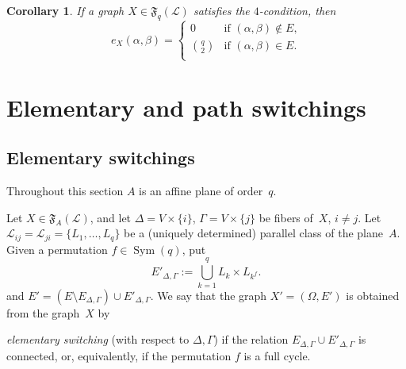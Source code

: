 \documentclass{amsart}
\newcommand{\cal}{\mathcal}
\newtheorem{corollary}[formula]{Corollary}
\def\crllrl#1{\begin{corollary}\label{#1}}
\def\ecrllr{\end{corollary}}
\def\css{\begin{cases}}
\def\ecss{\end{cases}}
\def\prf{\begin{proof}}
\def\eprf{\end{proof}}
\def\cL{{\cal L}}
\def\fF{{\mathfrak F}}
\DeclareMathOperator{\sym}{Sym}
\begin{document}
\crllrl{060623a14}
If a graph   $X\in\fF_q(\cL)$ satisfies the $4$-condition, then 
$$
e_X(\alpha,\beta)=
\css
0 &\text{if $(\alpha,\beta)\not \in E$,}\\
\binom{q}{2} &\text{if $(\alpha,\beta)\in E$.}\\
\ecss
$$
\ecrllr
\begin{comment}
\prf
Let $\alpha$ and $\beta$ be non-adjacent in $X$. By Lemma~\ref{110723a}, we have $b(\alpha,\beta)=0$. It follows that the graph $X_{N(\alpha,\beta)}$ is empty, where $N(\alpha,\beta)=N_X(\alpha,\beta)$. Thus, $e_X(\alpha,\beta)=0$. Now let $\alpha$ and $\beta$ be adjacent in $X$. Then any two vertices in the set $N(\alpha,\beta)$ must be adjacent (for otherwise $e_X(\alpha',\beta')\ne 0$ for some nonadjacent vertices $\alpha',\beta'\in N(\alpha,\beta)$). Thus, $e_X(\alpha,\beta)=\binom{q}{2}$.
\eprf
\end{comment}

\section{Elementary and path switchings}\label{290623a}


\subsection{Elementary switchings}
Throughout this section $A$ is  an affine plane of order~$q$.
  
Let $X\in \fF_A(\cL)$, and let $\Delta=V\times\{i\}$, $\Gamma=V\times\{j\}$ be fibers of~$X$, $i\ne j$.  Let $\cL_{ij}=\cL_{ji}=\{L_1,\ldots,L_q\}$ be a (uniquely determined) parallel class of the plane~$A$.  Given a permutation $f\in\sym(q)$, put 
$$
E'_{\Delta,\Gamma}:=\bigcup_{k=1}^qL_k\times L_{k^f}.
$$
and $E'=(E\setminus E^{}_{\Delta,\Gamma})\cup E'_{\Delta,\Gamma}$. We say that the graph $X'=(\Omega,E')$ is obtained from the graph~$X$ by 
\begin{comment}
{\it $f$-switching} with respect to the fibers $\Delta$ and $\Gamma$.  Certainly, any two graphs belonging to $\fF_A(\cL)$  can be obtained one from another by a suitable sequence of $f$-switchings.
An $f$-switching with respect to the fibers $\Delta$ and $\Gamma$ is said to be 
\end{comment}
{\it elementary switching} (with respect to $\Delta,\Gamma$) 
if the relation $E^{}_{\Delta,\Gamma}\cup E'_{\Delta,\Gamma}$ is connected, or, equivalently, if the permutation $f$ is a full cycle. 
\end{document}
